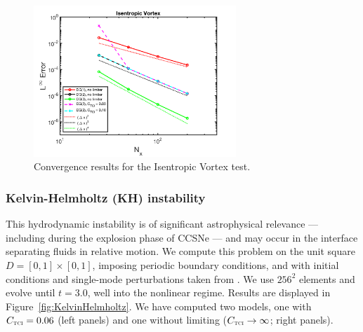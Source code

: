\documentclass[letterpaper]{jpconf}
\newcommand{\TCI}{\textnormal{\tiny\textsc{TCI}}}
\begin{document}
\begin{figure}
  \includegraphics[width=18pc]{./Figures/IsentropicVortex_Astronum_2018}
  \caption{\label{fig:IsentropicVortex}Convergence results for the Isentropic Vortex test.}
\end{figure}

\subsubsection{Kelvin-Helmholtz (KH) instability}
This hydrodynamic instability is of significant astrophysical relevance --- including during the explosion phase of CCSNe --- and may occur in the interface separating fluids in relative motion.  
We compute this problem on the unit square $D=[0,1]\times[0,1]$, imposing periodic boundary conditions, and with initial conditions and single-mode perturbations taken from \cite{mcnally_etal_2012}.  
We use $256^{2}$ elements and evolve until $t=3.0$, well into the nonlinear regime.  
Results are displayed in Figure~\ref{fig:KelvinHelmholtz}.  
We have computed two models, one with $C_{\TCI}=0.06$ (left panels) and one without limiting ($C_{\TCI}\to\infty$; right panels).  
\end{document}
